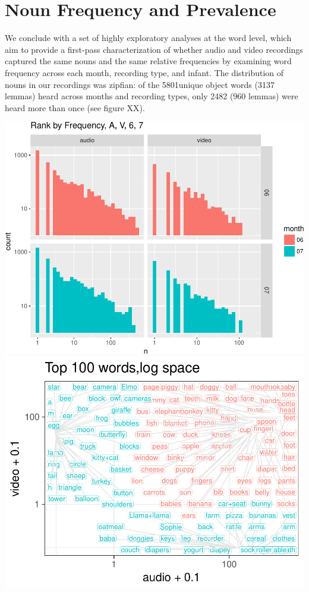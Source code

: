 \documentclass[floatsintext,man]{apa6}
\theoremstyle{definition}
\theoremstyle{definition}
\theoremstyle{definition}
\theoremstyle{remark}
\begin{document}
\section{Noun Frequency and
Prevalence}\label{noun-frequency-and-prevalence}

We conclude with a set of highly exploratory analyses at the word level,
which aim to provide a first-pass characterization of whether audio and
video recordings captured the same nouns and the same relative
frequencies by examining word frequency across each month, recording
type, and infant. The distribution of nouns in our recordings was
zipfian: of the 5801unique object words (3137 lemmas) heard across
months and recording types, only 2482 (960 lemmas) were heard more than
once (see figure XX).

\includegraphics{sixseven_papaja_files/figure-latex/noun_freq-1.pdf}
\includegraphics{sixseven_papaja_files/figure-latex/noun_freq-2.pdf}
\end{document}
